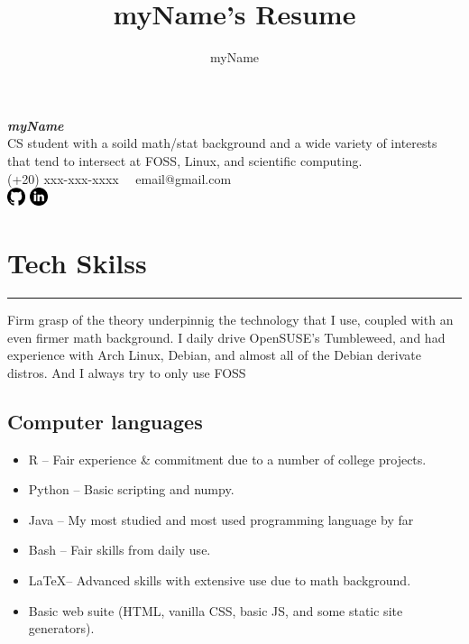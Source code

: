 \documentclass[10pt]{article}
\title{myName's Resume}
\author{myName}
\date{}
\newcommand{\fancy}[1]{\Large\textbf{\textit{#1}}}
\begin{document}


\begin{center}
    \Large\fancy{\huge myName} \\
    \vspace{1em}
    CS student with a soild math/stat background and a wide variety of interests that tend to intersect at FOSS, Linux, and scientific computing. \\
    \vspace{1em}
    (+20) xxx-xxx-xxxx \textbar\ \ email@gmail.com \\ %
    \vspace{10px}
    \href{https://github.com/}{\includegraphics[width=0.04\textwidth]{github.png}} \href{https://www.linkedin.com/}{\includegraphics[width=0.04\textwidth]{linkedin.png}}
\end{center}



\section*{Tech Skilss}
\hrule
\noindent
\vspace{0.7em}
\Large

Firm grasp of the theory underpinnig the technology that I use, coupled with an even firmer math background. I daily drive OpenSUSE's Tumbleweed, and had experience with Arch Linux, Debian, and almost all of the Debian derivate distros. And I always try to only use FOSS \par

\subsection*{\Large{Computer languages}}
\begin{itemize}
    \item R -- Fair experience \& commitment due to a number of college projects.
    \item Python -- Basic scripting and numpy.
    \item Java -- My most studied and most used programming language by far
    \item Bash -- Fair skills from daily use.
    \item \LaTeX -- Advanced skills with extensive use due to math background.
    \item Basic web suite (HTML, vanilla CSS, basic JS, and some static site generators).
\end{itemize}
\end{document}
